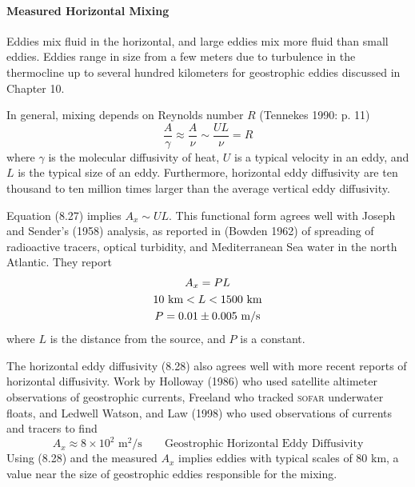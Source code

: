 \paragraph{Measured Horizontal Mixing}
Eddies mix fluid in the horizontal, and large eddies mix
more fluid than small eddies. Eddies range in size from a few meters due to
turbulence in the thermocline up to several hundred
kilometers for geostrophic eddies discussed in Chapter 10.

In general, mixing depends on Reynolds number $R$ (Tennekes 1990: p. 11)
\begin{equation}
\frac{A}{\gamma} \approx \frac{A}{\nu} \sim \frac{UL}{\nu} = R
\end{equation}
where $\gamma$ is the molecular diffusivity of heat, $U$ is a typical velocity in an eddy, and
$L$ is the typical size of an eddy. Furthermore, horizontal eddy diffusivity are ten thousand
to ten million times larger than the average vertical eddy diffusivity.

Equation (8.27) implies $A_x\sim UL$. This functional form agrees well with
Joseph and Sender's (1958) analysis, as reported in (Bowden 1962) of spreading
of radioactive tracers, optical turbidity, and Mediterranean Sea water in the
north Atlantic. They report
\begin{gather}
A_x = P L \\
10 \text{ km} < L < 1500 \text{ km} \notag \\
P = 0.01 \pm 0.005 \text{ m/s} \notag
\end{gather}
where $L$ is the distance from the source, and $P$ is a constant.

The horizontal eddy diffusivity (8.28) also agrees well with more recent reports
of horizontal diffusivity. Work by Holloway (1986) who used satellite
altimeter observations of geostrophic currents, Freeland who tracked \textsc{sofar} underwater floats, and Ledwell  Watson,
and Law (1998) who used observations of currents and tracers to find
\begin{equation}
A_x \approx 8 \times 10^2 \text{ m$^2$/s} \qquad \text{Geostrophic Horizontal
Eddy Diffusivity}
\end{equation}
Using (8.28) and the measured $A_x$ implies eddies with typical scales of 80 km, a value near the size of geostrophic eddies responsible for the mixing.

